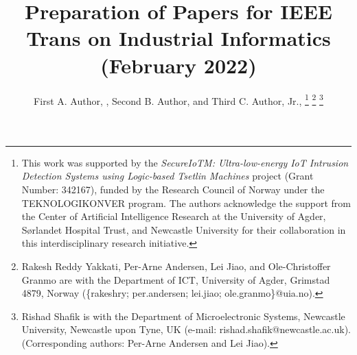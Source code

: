 \documentclass[journal,twoside,web]{ieeecolor}
\begin{document}
\title{Preparation of Papers for IEEE Trans on Industrial Informatics (February 2022)}
\author{First A. Author, , Second B. Author, and Third C. Author, Jr., 
\thanks{This work was supported by the \textit{SecureIoTM: Ultra-low-energy IoT Intrusion Detection Systems using Logic-based Tsetlin Machines} project (Grant Number: 342167), funded by the Research Council of Norway under the TEKNOLOGIKONVER program. 
The authors acknowledge the support from the Center of Artificial Intelligence Research at the University of Agder, Sørlandet Hospital Trust, and Newcastle University for their collaboration in this interdisciplinary research initiative.}%
\thanks{Rakesh Reddy Yakkati, Per-Arne Andersen, Lei Jiao, and Ole-Christoffer Granmo are with the Department of ICT, 
University of Agder, Grimstad 4879, Norway (\{rakeshry; per.andersen; lei.jiao; ole.granmo\}@uia.no). }
\thanks{Rishad Shafik is with the Department of Microelectronic Systems, Newcastle University, Newcastle upon Tyne, UK (e-mail: rishad.shafik@newcastle.ac.uk). (Corresponding authors: Per-Arne Andersen and Lei Jiao).}}

\maketitle
\end{document}

